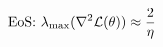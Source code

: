 \documentclass[preview]{standalone}
\begin{document}
\begin{align*}
\special{dvisvgm:raw <g id='unique000'>}\text{EoS: }\lambda_{\max}(\nabla^2\mathcal{L}(\theta)) \approx \frac{2}{\eta}\special{dvisvgm:raw </g>}
\end{align*}
\end{document}
